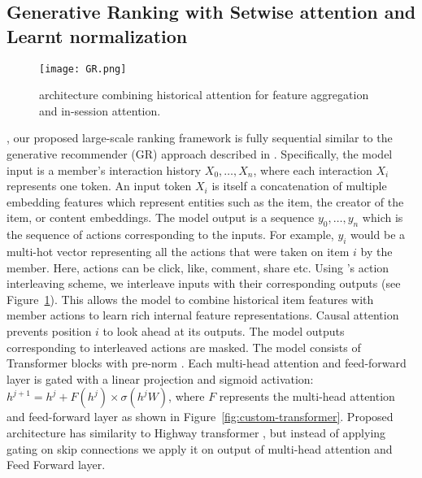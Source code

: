 \subsection{Generative Ranking with Setwise attention and Learnt normalization}\label{sec:Overview_architecture}

\begin{figure}
    \centering
    \texttt{[image: GR.png]}
    \caption{{\systemname} architecture combining historical attention for feature aggregation and in-session attention.}
    \label{fig:model_arch}
\end{figure}


{\systemname}, our proposed large-scale ranking framework is fully sequential similar to the generative recommender (GR) approach described in \cite{HSTU_paper_zhai24a}.
Specifically, the model input is a member's interaction history $X_0, \ldots, X_n$, where each interaction $X_i$ represents one token. An input token $X_i$ is itself a concatenation of multiple embedding features which represent entities such as the item, the creator of the item, or content embeddings.
The model output is a sequence $y_0, \ldots, y_n$ which is the sequence of actions corresponding to the inputs. For example, $y_i$ would be a multi-hot vector representing all the actions that were taken on item $i$ by the member. Here, actions can be click, like, comment, share etc.
Using \cite{HSTU_paper_zhai24a}'s action interleaving scheme, we interleave inputs with their corresponding outputs (see Figure~\ref{fig:model_arch}). This allows the model to combine historical item features with member actions to learn rich internal feature representations. Causal attention prevents position $i$ to look ahead at its outputs. The model outputs corresponding to interleaved actions are masked.
The model consists of Transformer blocks \cite{vaswani2017attention} with pre-norm \cite{baevski2018adaptive,child2019generating,wang2019learning}. Each multi-head attention and feed-forward layer is gated with a linear projection and sigmoid activation: $h^{j+1} = h^j + F(h^j) \times \sigma(h^j W)$, where $F$ represents the multi-head attention and feed-forward layer as shown in Figure~\ref{fig:custom-transformer}. Proposed architecture has similarity to Highway transformer \cite{chai-etal-2020-highway}, but instead of applying gating on skip connections we apply it on output of multi-head attention and Feed Forward layer.

